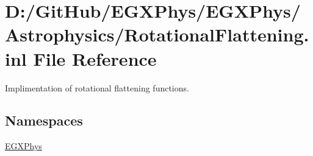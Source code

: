 \hypertarget{_rotational_flattening_8inl}{}\section{D\+:/\+Git\+Hub/\+E\+G\+X\+Phys/\+E\+G\+X\+Phys/\+Astrophysics/\+Rotational\+Flattening.inl File Reference}
\label{_rotational_flattening_8inl}


Implimentation of rotational flattening functions.  


\subsection*{Namespaces}
\begin{DoxyCompactItemize}
\item 
 \mbox{\hyperlink{namespace_e_g_x_phys}{E\+G\+X\+Phys}}
\end{DoxyCompactItemize}
